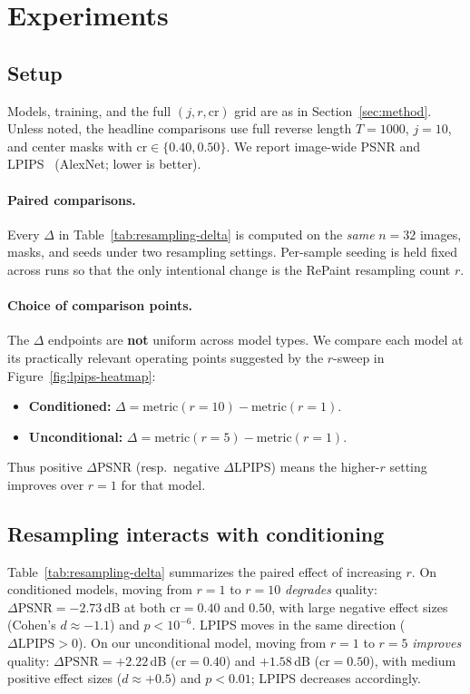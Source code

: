 
\section{Experiments}
\label{sec:experiments}

\subsection{Setup}
\label{sec:setup}
Models, training, and the full $(j,r,\mathrm{cr})$ grid are as in Section~\ref{sec:method}.
Unless noted, the headline comparisons use full reverse length $T{=}1000$, $j{=}10$, and center masks with $\mathrm{cr}\in\{0.40,0.50\}$.
We report image-wide PSNR and LPIPS~\citep{zhang2018lpips} (AlexNet; lower is better).

\paragraph{Paired comparisons.}
Every $\Delta$ in Table~\ref{tab:resampling-delta} is computed on the \emph{same} $n{=}32$ images, masks, and seeds under two resampling settings.
Per-sample seeding is held fixed across runs so that the only intentional change is the RePaint resampling count $r$.

\paragraph{Choice of comparison points.}
The $\Delta$ endpoints are \textbf{not} uniform across model types.
We compare each model at its practically relevant operating points suggested by the $r$-sweep in Figure~\ref{fig:lpips-heatmap}:
\begin{itemize}
  \item \textbf{Conditioned:} $\Delta = \mathrm{metric}(r{=}10) - \mathrm{metric}(r{=}1)$.
  \item \textbf{Unconditional:} $\Delta = \mathrm{metric}(r{=}5) - \mathrm{metric}(r{=}1)$.
\end{itemize}
Thus positive $\Delta$PSNR (resp.\ negative $\Delta$LPIPS) means the higher-$r$ setting improves over $r{=}1$ for that model.

\subsection{Resampling interacts with conditioning}
\label{sec:resampling-interaction}
Table~\ref{tab:resampling-delta} summarizes the paired effect of increasing $r$.
On conditioned models, moving from $r{=}1$ to $r{=}10$ \emph{degrades} quality: $\Delta\mathrm{PSNR}{=}{-}2.73$\,dB at both $\mathrm{cr}{=}0.40$ and $0.50$, with large negative effect sizes (Cohen's $d{\approx}{-}1.1$) and $p{<}10^{-6}$.
LPIPS moves in the same direction ($\Delta\mathrm{LPIPS}{>}0$).
On our unconditional model, moving from $r{=}1$ to $r{=}5$ \emph{improves} quality: $\Delta\mathrm{PSNR}{=}{+}2.22$\,dB ($\mathrm{cr}{=}0.40$) and ${+}1.58$\,dB ($\mathrm{cr}{=}0.50$), with medium positive effect sizes ($d{\approx}{+}0.5$) and $p{<}0.01$; LPIPS decreases accordingly.

